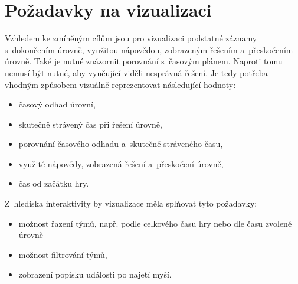 \documentclass[
  digital, %
  oneside, %
  table,   %
  nolof,     %
  nolot,     %
]{fithesis3}
\begin{document}
\section{Požadavky na vizualizaci}
Vzhledem ke zmíněným cílům jsou pro vizualizaci podstatné záznamy s~dokončením úrovně, využitou nápovědou, zobrazeným řešením a~přeskočením úrovně. Také je nutné znázornit porovnání s~časovým plánem. Naproti tomu nemusí být nutné, aby vyučující viděli nesprávná řešení. Je tedy potřeba vhodným způsobem vizuálně reprezentovat následující hodnoty:
\begin{itemize}
  \item časový odhad úrovní,
  \item skutečně strávený čas při řešení úrovně,
  \item porovnání časového odhadu a~skutečně stráveného času,
  \item využité nápovědy, zobrazená řešení a~přeskočení úrovně,
  \item čas od začátku hry.
\end{itemize}
Z~hlediska interaktivity by vizualizace měla splňovat tyto požadavky:
\begin{itemize}
  \item možnost řazení týmů, např. podle celkového času hry nebo dle času zvolené úrovně
  \item možnost filtrování týmů,
  \item zobrazení popisku události po najetí myší.
\end{itemize}
\end{document}
